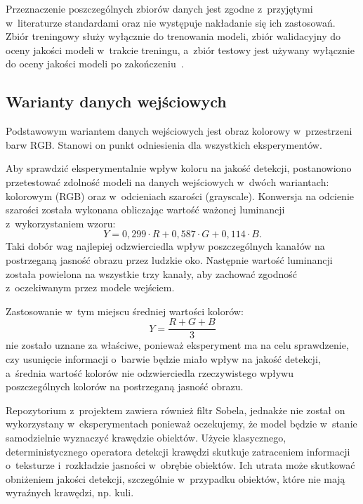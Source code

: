 Przeznaczenie poszczególnych zbiorów danych jest zgodne z~przyjętymi w~literaturze standardami oraz nie występuje nakładanie się ich zastosowań. Zbiór treningowy służy wyłącznie do trenowania modeli, zbiór walidacyjny do oceny jakości modeli w~trakcie treningu, a~zbiór testowy jest używany wyłącznie do oceny jakości modeli po zakończeniu~.

\subsection{Warianty danych wejściowych}

Podstawowym wariantem danych wejściowych jest obraz kolorowy w~przestrzeni barw RGB. Stanowi on punkt odniesienia dla wszystkich eksperymentów.

Aby sprawdzić eksperymentalnie wpływ koloru na jakość detekcji, postanowiono przetestować zdolność modeli na danych wejściowych w~dwóch wariantach: kolorowym (RGB) oraz w~odcieniach szarości (grayscale). Konwersja na odcienie szarości została wykonana obliczając wartość ważonej luminancji z~wykorzystaniem wzoru:
\begin{equation}
    Y = 0,299 \cdot R + 0,587 \cdot G + 0,114 \cdot B.
\end{equation}
Taki dobór wag najlepiej odzwierciedla wpływ poszczególnych kanałów na postrzeganą jasność obrazu przez ludzkie oko. Następnie wartość luminancji została powielona na wszystkie trzy kanały, aby zachować zgodność z~oczekiwanym przez modele wejściem.

Zastosowanie w~tym miejscu średniej wartości kolorów:
\begin{equation}
    Y = \frac{R + G + B}{3}
\end{equation}
nie zostało uznane za właściwe, ponieważ eksperyment ma na celu sprawdzenie, czy usunięcie informacji o~barwie będzie miało wpływ na jakość detekcji, a~średnia wartość kolorów nie odzwierciedla rzeczywistego wpływu poszczególnych kolorów na postrzeganą jasność obrazu.

Repozytorium z~projektem zawiera również filtr Sobela, jednakże nie został on wykorzystany w~eksperymentach ponieważ oczekujemy, że model będzie w~stanie samodzielnie wyznaczyć krawędzie obiektów. Użycie klasycznego, deterministycznego operatora detekcji krawędzi skutkuje zatraceniem informacji o~teksturze i~rozkładzie jasności w~obrębie obiektów. Ich utrata może skutkować obniżeniem jakości detekcji, szczególnie w~przypadku obiektów, które nie mają wyraźnych krawędzi, np. kuli.

